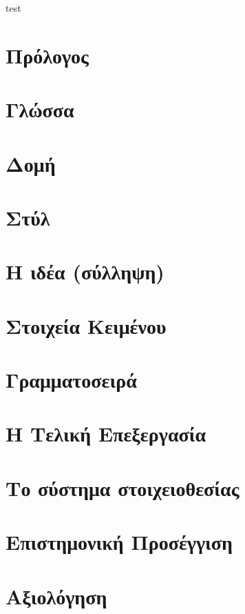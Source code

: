 \documentclass[a4paper,12pt,oneside]{book}
\begin{document}
test
\frontmatter

\clearpage

\clearpage




\mainmatter
\setcounter{page}{1}
\chapter{Πρόλογος}

\chapter{Γλώσσα}

\chapter{Δομή}

\chapter{Στύλ}

\chapter{Η ιδέα (σύλληψη)}

\chapter{Στοιχεία Κειμένου}

\chapter{Γραμματοσειρά}

\chapter{Η Τελική Επεξεργασία}

\chapter{Το σύστημα στοιχειοθεσίας}

\chapter{Επιστημονική Προσέγγιση}

\chapter{Αξιολόγηση}

\end{document}
